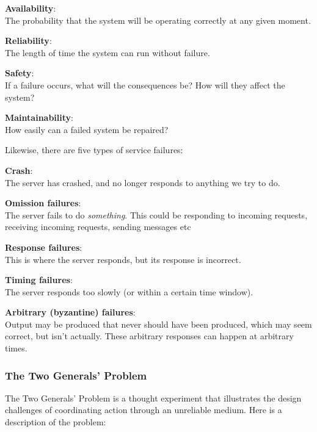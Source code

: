 \begin{description}
  \item \textbf{Availability}:\\
    The probability that the system will be operating correctly at any given
    moment.
  \item \textbf{Reliability}:\\
    The length of time the system can run without failure.
  \item \textbf{Safety}:\\
    If a failure occurs, what will the consequences be? How will they affect the 
    system?
  \item \textbf{Maintainability}:\\
    How easily can a failed system be repaired?
\end{description}

Likewise, there are five types of service failures:

\begin{description}
  \item \textbf{Crash}:\\
    The server has crashed, and no longer responds to anything we try to do.
  \item \textbf{Omission failures}:\\
    The server fails to do \textit{something}. This could be responding to
    incoming requests, receiving incoming requests, sending messages etc
  \item \textbf{Response failures}:\\
    This is where the server responds, but its response is incorrect.
  \item \textbf{Timing failures}:\\
    The server responds too slowly (or within a certain time window).
  \item \textbf{Arbitrary (byzantine) failures}:\\
    Output may be produced that never should have been produced, which may seem
    correct, but isn't actually. These arbitrary responses can happen at
    arbitrary times.
\end{description}

\subsubsection{The Two Generals' Problem}

The Two Generals' Problem is a thought experiment that illustrates the design
challenges of coordinating action through an unreliable medium. Here is a
description of the problem:

